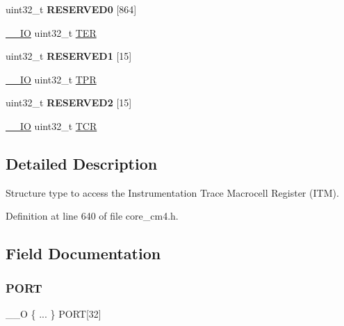 \begin{DoxyCompactItemize}
\begin{tabbing}
\end{tabbing}\item 
\mbox{\label{struct_i_t_m___type_a498ca2f25075b26fd57d1f66d976fe8c}} 
uint32\+\_\+t {\bfseries R\+E\+S\+E\+R\+V\+E\+D0} \mbox{[}864\mbox{]}
\item 
\hyperlink{group___c_m_s_i_s__core__definitions_gaec43007d9998a0a0e01faede4133d6be}{\+\_\+\+\_\+\+IO} uint32\+\_\+t \hyperlink{struct_i_t_m___type_a8ffb3c6b706b03334f6fe37ef5d8b165}{T\+ER}
\item 
\mbox{\label{struct_i_t_m___type_ae5c625673da1df1777833e51754c525b}} 
uint32\+\_\+t {\bfseries R\+E\+S\+E\+R\+V\+E\+D1} \mbox{[}15\mbox{]}
\item 
\hyperlink{group___c_m_s_i_s__core__definitions_gaec43007d9998a0a0e01faede4133d6be}{\+\_\+\+\_\+\+IO} uint32\+\_\+t \hyperlink{struct_i_t_m___type_a72bb9b7d61fe3262cd2a6070a7bd5b69}{T\+PR}
\item 
\mbox{\label{struct_i_t_m___type_a391748a705084dd61c4a9f56d456a12c}} 
uint32\+\_\+t {\bfseries R\+E\+S\+E\+R\+V\+E\+D2} \mbox{[}15\mbox{]}
\item 
\hyperlink{group___c_m_s_i_s__core__definitions_gaec43007d9998a0a0e01faede4133d6be}{\+\_\+\+\_\+\+IO} uint32\+\_\+t \hyperlink{struct_i_t_m___type_ae9dd9282fab299d0cd6e119564688e53}{T\+CR}
\end{DoxyCompactItemize}


\subsection{Detailed Description}
Structure type to access the Instrumentation Trace Macrocell Register (I\+TM). 

Definition at line 640 of file core\+\_\+cm4.\+h.



\subsection{Field Documentation}
\mbox{\label{struct_i_t_m___type_aca2b00738a4a346efcd8325e18fcfa8a}} 
\subsubsection{\texorpdfstring{P\+O\+RT}{PORT}}
{\footnotesize\ttfamily \+\_\+\+\_\+O \{ ... \}    P\+O\+RT\mbox{[}32\mbox{]}}


